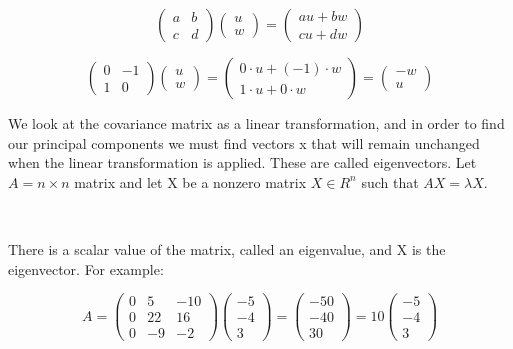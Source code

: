 \documentclass{article}
\begin{document}
\begin{equation*}
\begin{pmatrix}
a & b \\
c & d
\end{pmatrix}
\begin{pmatrix}
u \\
w
\end{pmatrix}
=
\begin{pmatrix}
au + bw \\
cu + dw
\end{pmatrix}
\end{equation*}

\begin{equation*}
\begin{pmatrix}
0 & -1 \\
1 & 0
\end{pmatrix}
\begin{pmatrix}
u \\
w
\end{pmatrix}
=
\begin{pmatrix}
0 \cdot u + (-1) \cdot w \\
1 \cdot u + 0 \cdot w
\end{pmatrix}
=
\begin{pmatrix}
-w \\
u
\end{pmatrix}
\end{equation*}

We look at the covariance matrix as a linear transformation, and in order to find our principal components we must find vectors x that will remain unchanged when the linear transformation is applied. These are called eigenvectors. Let $A = n \times n$ matrix and let X be a nonzero matrix $X \in R^n$ such that $AX = \lambda X$.

\

There is a scalar value of the matrix, called an eigenvalue, and X is the eigenvector. For example:

\begin{equation*}
A = \begin{pmatrix} 0 & 5 & -10 \\ 0 & 22 & 16 \\ 0 & -9 & -2 \end{pmatrix} \begin{pmatrix} -5 \\ -4 \\ 3 \end{pmatrix} = \begin{pmatrix} -50 \\ -40 \\ 30 \end{pmatrix} = 10 \begin{pmatrix} -5 \\ -4 \\ 3 \end{pmatrix}
\end{equation*}
\end{document}

